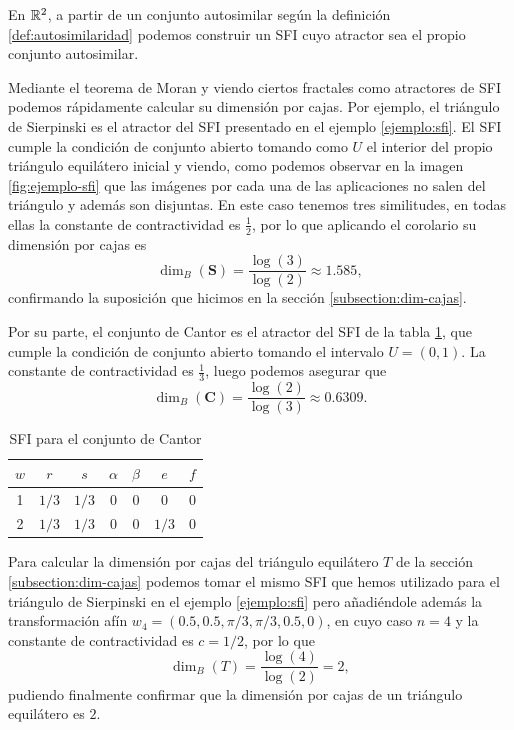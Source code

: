 \begin{observacion}
    En $\mathbb{R}^2$, a partir de un conjunto autosimilar según la definición \ref{def:autosimilaridad} podemos construir un SFI cuyo atractor sea el propio conjunto autosimilar.
\end{observacion}

Mediante el teorema de Moran y viendo ciertos fractales como atractores de SFI podemos rápidamente calcular su dimensión por cajas. Por ejemplo, el triángulo de Sierpinski es el atractor del SFI presentado en el ejemplo \ref{ejemplo:sfi}. El SFI cumple la condición de conjunto abierto tomando como $U$ el interior del propio triángulo equilátero inicial y viendo, como podemos observar en la imagen \ref{fig:ejemplo-sfi} que las imágenes por cada una de las aplicaciones no salen del triángulo y además son disjuntas.  En este caso tenemos tres similitudes, en todas ellas la constante de contractividad es $\frac{1}{2}$, por lo que aplicando el corolario su dimensión por cajas es 
$$\dim_B(\mathbf{S})=\frac{\log(3)}{\log(2)}\approx 1.585,$$
confirmando la suposición que hicimos en la sección \ref{subsection:dim-cajas}.

Por su parte, el conjunto de Cantor es el atractor del SFI de la tabla \ref{tabla:Cantor}, que cumple la condición de conjunto abierto tomando el intervalo $U=(0,1)$. La constante de contractividad es $\frac{1}{3}$, luego podemos asegurar que 
$$\dim_B(\mathbf C)=\frac{\log(2)}{\log(3)}\approx 0.6309.$$

\begin{table}[ht]
    \centering
    \begin{tabular}{c|cccccc} \hline
        $w$ & $r$ & $s$ & $\alpha$ & $\beta$ & $e$ & $f$ \\ \hline\hline
    1 & $1/3$ & $1/3$ & 0 & 0 & 0 & 0 \\ \hline
    2 & $1/3$ & $1/3$ & $0$ & $0$ & $1/3$ & 0 \\ \hline
    \end{tabular}
    \caption{SFI para el conjunto de Cantor}
    \label{tabla:Cantor}
\end{table}

Para calcular la dimensión por cajas del triángulo equilátero $T$ de la sección \ref{subsection:dim-cajas} podemos tomar el mismo SFI que hemos utilizado para el triángulo de Sierpinski en el ejemplo \ref{ejemplo:sfi} pero añadiéndole además la transformación afín $w_4 = \left(0.5, 0.5, \pi/3, \pi/3, 0.5, 0\right)$, en cuyo caso $n=4$ y la constante de contractividad es $c=1/2$, por lo que 
$$\dim_B(T)=\frac{\log(4)}{\log(2)}=2,$$ 
pudiendo finalmente confirmar que la dimensión por cajas de un triángulo equilátero es $2$.

